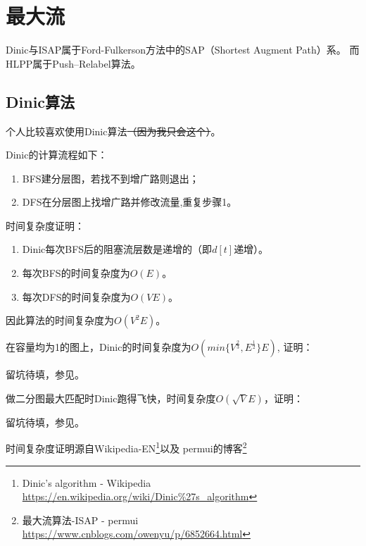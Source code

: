 \section{最大流}
Dinic与ISAP属于Ford-Fulkerson方法中的SAP（Shortest Augment Path）系。
而HLPP属于Push–Relabel算法。
\subsection{Dinic算法}
个人比较喜欢使用Dinic算法\sout{（因为我只会这个）}。

Dinic的计算流程如下：
\begin{enumerate}
	\item BFS建分层图，若找不到增广路则退出；
	\item DFS在分层图上找增广路并修改流量,重复步骤1。
\end{enumerate}

时间复杂度证明：

\begin{enumerate}
	\item \begin{lemma}
		Dinic每次BFS后的阻塞流层数是递增的（即$d[t]$递增）。
	\end{lemma}
	\item 每次BFS的时间复杂度为$O(E)$。
	\item 每次DFS的时间复杂度为$O(VE)$。
\end{enumerate}

因此算法的时间复杂度为$O(V^2E)$。

在容量均为1的图上，Dinic的时间复杂度为$O(min \{ V^\frac{2}{3},E^\frac{1}{2} \} E)$,
证明：

留坑待填，参见\cite{NFTGC}。

做二分图最大匹配时Dinic跑得飞快，时间复杂度$O(\sqrt V E)$，证明：

留坑待填，参见\cite{DSNA}。


时间复杂度证明源自Wikipedia-EN\footnote{
	Dinic's algorithm - Wikipedia
	\url{https://en.wikipedia.org/wiki/Dinic\%27s\_algorithm}}以及
	permui的博客\footnote{ 最大流算法-ISAP - permui
		\url{https://www.cnblogs.com/owenyu/p/6852664.html}}
